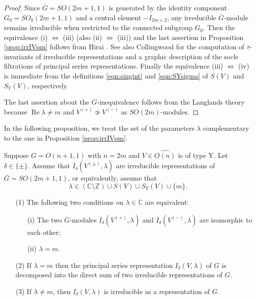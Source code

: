 \begin{proof}
Since $\overline G=SO(2m+1,1)$ is generated 
 by the identity component 
 $G_0=SO_0(2m+1,1)$
 and a central element $-I_{2m+2}$, 
 any irreducible $\overline G$-module remains
 irreducible 
 when restricted to the connected subgroup $G_0$.  
Then the equivalence (i) $\Leftrightarrow$ (iii)
(also (ii) $\Leftrightarrow$ (iii))
 and the last assertion 
 in Proposition \ref{prop:irrIVpm} follows from
 Hirai \cite{Hirai62}.  
See also Collingwood \cite[Lem.~4.4.1 and Thm.~5.2.1]{C}
 for the computation of $\tau$-invariants
 of irreducible representations
 and a graphic description of the socle filtrations
 of principal series representations.  
Finally the equivalence (iii) $\Leftrightarrow$ (iv)
 is immediate from the definitions
 \eqref{eqn:singint} and \eqref{eqn:SYsigma}
 of $S(V)$ and $S_Y(V)$, 
 respectively.  



The last assertion about the $\overline G$-inequivalence follows from
 the Langlands theory \cite{La88}
 because $\operatorname{Re} \lambda \ne m$
 and $V^{(+)} \not \simeq V^{(-)}$
 as $SO(2m)$-modules.  
\end{proof}



In the following proposition,
 we treat the set
 of the parameters $\lambda$
 complementary to the one in Proposition \ref{prop:irrIVpm}.  
\begin{proposition}
\label{prop:180572}
Suppose $G=O(n+1,1)$ with $n=2m$
 and $V \in \widehat {O(n)}$ is of type Y.  
Let $\delta \in \{\pm\}$.  
Assume that $\overline I_{\delta}(V^{(\pm)},\lambda)$ are irreducible
 representations of $\overline G=SO(2m+1,1)$, 
 or equivalently, 
 assume that 
\[
   \lambda \in ({\mathbb{C}} \setminus {\mathbb{Z}}) \cup S(V) \cup S_Y(V) \cup \{m\}.  
\]
\begin{enumerate}
\item[{\rm{(1)}}]
The following two conditions on $\lambda \in {\mathbb{C}}$ 
 are equivalent:
\begin{enumerate}
\item[{\rm{(i)}}]
The two $\overline G$-modules $\overline I_{\delta}(V^{(+)},\lambda)$
 and $\overline I_{\delta}(V^{(-)},\lambda)$ are isomorphic
 to each other;
\item[{\rm{(ii)}}]
$\lambda =m$.  
\end{enumerate}

\item[{\rm{(2)}}]
If $\lambda=m$ then the principal series representation
 $I_{\delta}(V,\lambda)$ of $G$ is decomposed 
 into the direct sum of two irreducible representations
 of $G$.  
\item[{\rm{(3)}}]
If $\lambda \ne m$,  then $I_{\delta}(V,\lambda)$ is irreducible
 as a representation of $G$.  
\end{enumerate}
\end{proposition}

